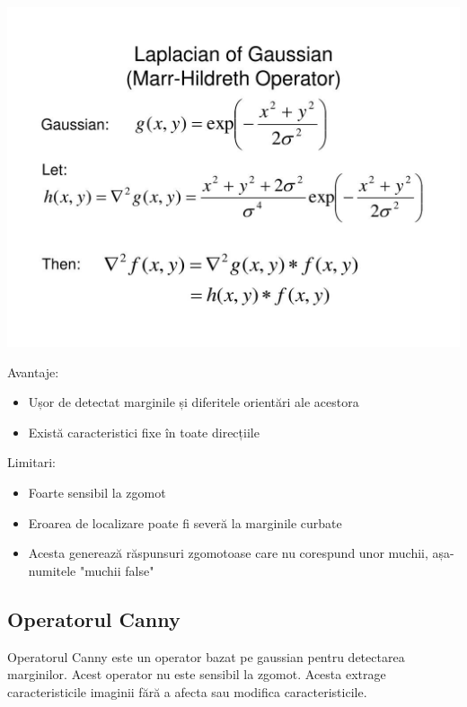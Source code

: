 \documentclass[10pt]{article}
\begin{document}
\begin{center}

  \includegraphics[scale=0.3]{marr-hildreth}
  
\end{center}

\> Avantaje:
\begin{itemize}

  \item Ușor de detectat marginile și diferitele orientări ale acestora
  \item Există caracteristici fixe în toate direcțiile
  
\end{itemize}

\> Limitari:
\begin{itemize}

  \item Foarte sensibil la zgomot
  \item Eroarea de localizare poate fi severă la marginile curbate
  \item Acesta generează răspunsuri zgomotoase care nu corespund unor muchii, așa-numitele "muchii false"
  
\end{itemize}

\newpage


\subsection{Operatorul Canny}

\> Operatorul Canny este un operator bazat pe gaussian pentru detectarea marginilor. 
Acest operator nu este sensibil la zgomot. Acesta extrage caracteristicile imaginii fără a afecta sau modifica caracteristicile.
\end{document}
